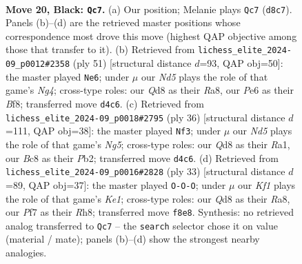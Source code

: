 \documentclass[11pt]{article}
\begin{document}
\clearpage

\begin{figure}[p]\centering
\begin{subfigure}{0.46\textwidth}\centering
\resizebox{\linewidth}{!}{%
\newchessgame
\chessboard[
  setfen={r1bq1k2/pp3pp1/n3p3/3pP3/3n1r2/PP1QN3/6PP/R3K1NR b KQ - 1 20},
  showmover=false,
  pgfstyle=straightmove, color=movearrow, markmove={d8-c7}
]}
\caption{}
\end{subfigure}\hfill
\begin{subfigure}{0.46\textwidth}\centering
\resizebox{\linewidth}{!}{%
\newchessgame
\chessboard[
  setfen={r3kbr1/2q2p2/1pp2B1p/p4Nn1/P1P1P3/4Q1p1/2P3P1/3R1R1K b q - 0 26},
  showmover=false,
  pgfstyle=straightmove, color=movearrow, markmove={g5-e6}
]}
\caption{}
\end{subfigure}
\\[4pt]
\begin{subfigure}{0.46\textwidth}\centering
\resizebox{\linewidth}{!}{%
\newchessgame
\chessboard[
  setfen={4r1k1/pp1q1pb1/6pp/2pp2N1/3n1B2/P2P3P/1PPQ1PP1/R5K1 w - - 0 19},
  showmover=false,
  pgfstyle=straightmove, color=movearrow, markmove={g5-f3}
]}
\caption{}
\end{subfigure}\hfill
\begin{subfigure}{0.46\textwidth}\centering
\resizebox{\linewidth}{!}{%
\newchessgame
\chessboard[
  setfen={r3k2r/2q2p1p/2p4p/p3pb2/PpB1n3/4Q2P/1PP1NPP1/R3K2R b KQkq - 3 17},
  showmover=false,
  pgfstyle=straightmove, color=movearrow, markmove={e8-c8}
]}
\caption{}
\end{subfigure}
\caption{\textbf{Move 20, Black: \texttt{Qc7}.} (a) Our position; Melanie plays \texttt{Qc7} (\texttt{d8c7}). Panels (b)--(d) are the retrieved master positions whose correspondence most drove this move (highest QAP objective among those that transfer to it). (b) Retrieved from \texttt{lichess\_elite\_2024-09\_p0012\#2358} (ply 51) [structural distance $d$=93, QAP obj=50]: the master played \texttt{Ne6}; under $\mu$ our \emph{Nd5} plays the role of that game's \emph{Ng4}; cross-type roles: our \emph{Q}d8 as their \emph{R}a8, our \emph{P}e6 as their \emph{B}f8; transferred move \texttt{d4c6}. (c) Retrieved from \texttt{lichess\_elite\_2024-09\_p0018\#2795} (ply 36) [structural distance $d$=111, QAP obj=38]: the master played \texttt{Nf3}; under $\mu$ our \emph{Nd5} plays the role of that game's \emph{Ng5}; cross-type roles: our \emph{Q}d8 as their \emph{R}a1, our \emph{B}c8 as their \emph{P}b2; transferred move \texttt{d4c6}. (d) Retrieved from \texttt{lichess\_elite\_2024-09\_p0016\#2828} (ply 33) [structural distance $d$=89, QAP obj=37]: the master played \texttt{O-O-O}; under $\mu$ our \emph{Kf1} plays the role of that game's \emph{Ke1}; cross-type roles: our \emph{Q}d8 as their \emph{R}a8, our \emph{P}f7 as their \emph{R}h8; transferred move \texttt{f8e8}. Synthesis: no retrieved analog transferred to \texttt{Qc7} -- the \texttt{search} selector chose it on value (material / mate); panels (b)--(d) show the strongest nearby analogies.}
\label{fig:thought-m39}
\end{figure}
\end{document}
